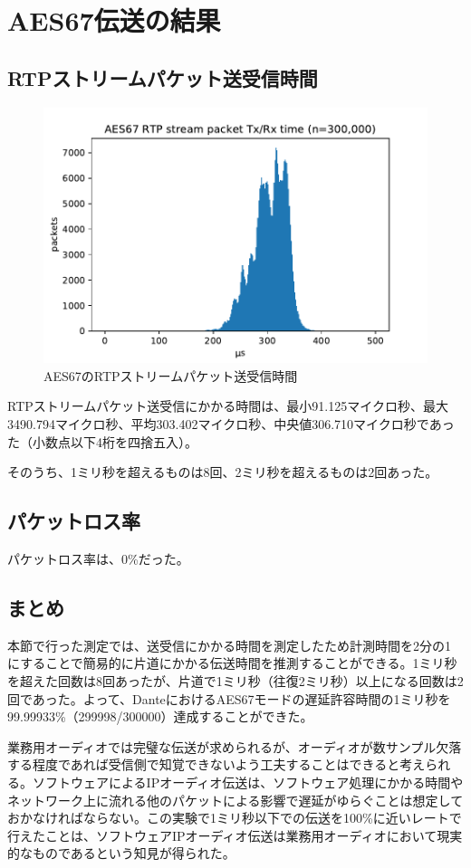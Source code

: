 \section{AES67伝送の結果}

\subsection{RTPストリームパケット送受信時間}

\begin{figure}[tbp]
  \centering
  \includegraphics[width=\linewidth]{img/packets_graph.pdf}
  \caption{AES67のRTPストリームパケット送受信時間}
  \label{fig:packets_graph}
\end{figure}

RTPストリームパケット送受信にかかる時間は、最小91.125マイクロ秒、最大3490.794マイクロ秒、平均303.402マイクロ秒、中央値306.710マイクロ秒であった（小数点以下4桁を四捨五入）。

そのうち、1ミリ秒を超えるものは8回、2ミリ秒を超えるものは2回あった。

\subsection{パケットロス率}

パケットロス率は、0\%だった。

\subsection{まとめ}

本節で行った測定では、送受信にかかる時間を測定したため計測時間を2分の1にすることで簡易的に片道にかかる伝送時間を推測することができる。1ミリ秒を超えた回数は8回あったが、片道で1ミリ秒（往復2ミリ秒）以上になる回数は2回であった。よって、DanteにおけるAES67モードの遅延許容時間の1ミリ秒を99.99933\%（299998/300000）達成することができた。

業務用オーディオでは完璧な伝送が求められるが、オーディオが数サンプル欠落する程度であれば受信側で知覚できないよう工夫することはできると考えられる。ソフトウェアによるIPオーディオ伝送は、ソフトウェア処理にかかる時間やネットワーク上に流れる他のパケットによる影響で遅延がゆらぐことは想定しておかなければならない。この実験で1ミリ秒以下での伝送を100\%に近いレートで行えたことは、ソフトウェアIPオーディオ伝送は業務用オーディオにおいて現実的なものであるという知見が得られた。
